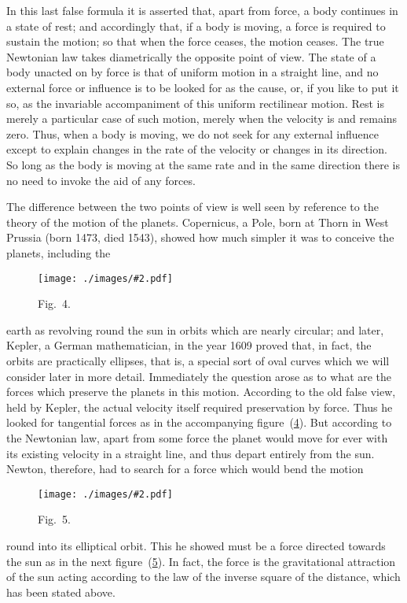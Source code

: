 \documentclass[12pt,leqno]{book}[2005/09/16]
\newcommand{\Graphic}[2]{%
  \phantomsection\label{fig:#2}%
  \texttt{[image: ./images/\#2.pdf]}%
}
\newcommand{\DefWidth}{4in}%
\newcommand{\Figure}[2][\DefWidth]{%
  \begin{figure}[hbt!]
    \centering
    \phantomsection\label{fig:#2}
    \Graphic{#1}{fig#2}
    \caption{Fig.~#2.}
  \end{figure}\ignorespaces%
}
\newcommand{\FigNum}[1]{\hyperref[fig:#1]{#1}}
\newcommand{\PageSep}[1]{\ignorespaces}
\begin{document}
In this last false formula it is asserted that,
apart from force, a body continues in a state
of rest; and accordingly that, if a body is
moving, a force is required to sustain the
motion; so that when the force ceases, the
motion ceases. The true Newtonian law
takes diametrically the opposite point of view.
The state of a body unacted on by force is
that of uniform motion in a straight line, and
no external force or influence is to be looked
for as the cause, or, if you like to put it so, as
the invariable accompaniment of this uniform
rectilinear motion. Rest is merely a particular
case of such motion, merely when the
velocity is and remains zero. Thus, when a
body is moving, we do not seek for any external
influence except to explain changes in
the rate of the velocity or changes in its direction.
So long as the body is moving at the
\PageSep{45}
same rate and in the same direction there is
no need to invoke the aid of any forces.

The difference between the two points of
view is well seen by reference to the theory of
the motion of the planets. Copernicus, a
%
Pole, born at Thorn in West Prussia (born
1473, died 1543), showed how much simpler
it was to conceive the planets, including the
\Figure[2.25in]{4}
earth as revolving round the sun in orbits
which are nearly circular; and later, Kepler,
%
a German mathematician, in the year 1609
proved that, in fact, the orbits are practically
ellipses, that is, a special sort of oval curves
%
which we will consider later in more detail.
Immediately the question arose as to what
are the forces which preserve the planets in
this motion. According to the old false view,
\PageSep{46}
held by Kepler, the actual velocity itself required
%
preservation by force. Thus he looked
for tangential forces as in the accompanying
figure~(\FigNum{4}). But according to the Newtonian
law, apart from some force the planet would
move for ever with its existing velocity in a
straight line, and thus depart entirely from
the sun. Newton, therefore, had to search
%
for a force which would bend the motion
\Figure[2.25in]{5}
round into its elliptical orbit. This he showed
must be a force directed towards the sun as in
the next figure~(\FigNum{5}). In fact, the force is the
gravitational attraction of the sun acting
according to the law of the inverse square of
the distance, which has been stated above.
\end{document}
